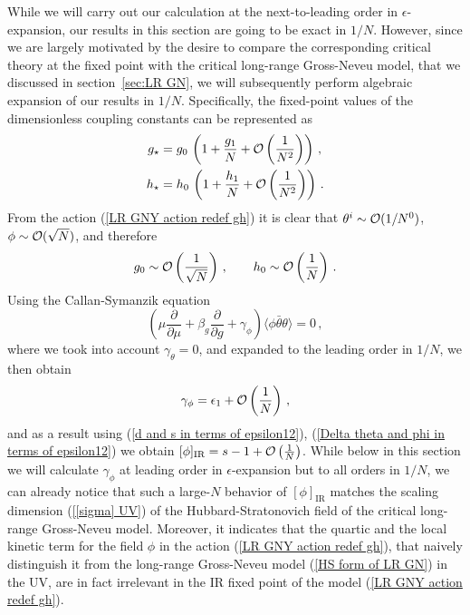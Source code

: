 \documentclass[aps,amsmath,amssymb,prd,showpacs,floatfix,preprint,superscriptaddress,nofootinbib,12pt]{article}
\begin{document}
While we will carry out our calculation at the next-to-leading order in $\epsilon$-expansion,
our results in this section are going to be exact in $1/N$. However, since we are largely
motivated by the desire to compare the corresponding critical theory at the fixed
point with the critical long-range Gross-Neveu model, that we discussed in section~\ref{sec:LR GN},
we will subsequently perform algebraic expansion of our results in $1/N$. Specifically,
the fixed-point values of the dimensionless coupling constants can be represented as
\begin{equation}
\label{1/N expansion of g and h in GNY}
\begin{aligned}
g_\star &= g_0\,\left(1+\frac{g_1}{N} + {\cal O}\left(\frac{1}{N^2}\right)\right)\,,\\
h_\star &= h_0\,\left(1+\frac{h_1}{N} + {\cal O}\left(\frac{1}{N^2}\right)\right)\,.
\end{aligned}
\end{equation}
From the action (\ref{LR GNY action redef gh}) it is clear that $\theta ^ i\sim{\cal O}(1/N^0)$,
$\phi\sim{\cal O}(\sqrt{N})$, and therefore
\begin{equation}
g_0\sim {\cal O}\left(\frac{1}{\sqrt{N}}\right)\,,\qquad
h_0\sim {\cal O}\left(\frac{1}{N}\right)\,.
\end{equation}
Using the Callan-Symanzik equation
\begin{equation}
\left(\mu\frac{\partial}{\partial\mu} + \beta_g\frac{\partial}{\partial g} + \gamma_\phi\right) \langle
 \phi \bar\theta\theta\rangle = 0\,,
\end{equation}
where we took into account $\gamma_\theta = 0$, and expanded to the leading
order in $1/N$, we then obtain
\begin{equation}
\gamma_\phi = \epsilon_1 + {\cal O}\left(\frac{1}{N}\right)\,,
\end{equation}
and as a result using (\ref{d and s in terms of epsilon12}),
(\ref{Delta theta and phi in terms of epsilon12}) we obtain $[\phi]_{\textrm{IR}} = s-1+ {\cal O}\left(\frac{1}{N}\right)$.
While below in this section we will calculate $\gamma_\phi$ at leading order in $\epsilon$-expansion
but to all orders in $1/N$, we can already notice that such a large-$N$ behavior of $[\phi]_{\textrm{IR}}$
matches the scaling dimension (\ref{[sigma] UV}) of the Hubbard-Stratonovich field
of the critical long-range Gross-Neveu model. Moreover, it indicates that the quartic
and the local kinetic term for the field $\phi$ in the action (\ref{LR GNY action redef gh}),
that naively distinguish it from the long-range Gross-Neveu model (\ref{HS form of LR GN}) in the UV,
are in fact irrelevant in the IR fixed point of the model (\ref{LR GNY action redef gh}).
\end{document}
